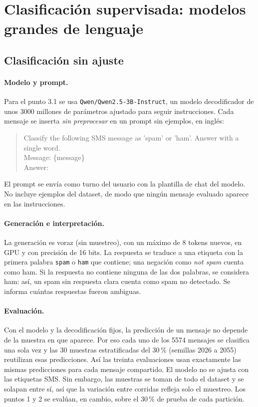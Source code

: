 \section{Clasificación supervisada: modelos grandes de lenguaje}
\label{sec:punto3}


\subsection{Clasificación sin ajuste}

\paragraph{Modelo y prompt.} Para el punto 3.1 se usa
\texttt{Qwen/Qwen2.5-3B-Instruct}, un modelo decodificador de unos 3000
millones de parámetros ajustado para seguir instrucciones. Cada mensaje se
inserta \emph{sin preprocesar} en un prompt sin ejemplos, en inglés:
\begin{quote}\small\ttfamily
Classify the following SMS message as 'spam' or 'ham'. Answer with a single
word.\\[2pt]
Message: \{message\}\\
Answer:
\end{quote}
El prompt se envía como turno del usuario con la plantilla de chat del modelo.
No incluye ejemplos del dataset, de modo que ningún mensaje evaluado aparece
en las instrucciones.

\paragraph{Generación e interpretación.} La generación es voraz (sin
muestreo), con un máximo de 8 tokens nuevos, en GPU y con precisión de 16
bits. La respuesta se traduce a una etiqueta con la primera palabra
\texttt{spam} o \texttt{ham} que contiene; una negación como \emph{not spam}
cuenta como ham. Si la respuesta no contiene ninguna de las dos palabras, se
considera ham: así, un spam sin respuesta clara cuenta como spam no detectado.
Se informa cuántas respuestas fueron ambiguas.

\paragraph{Evaluación.} Con el modelo y la decodificación fijos, la
predicción de un mensaje no depende de la muestra en que aparece. Por eso cada
uno de los 5574 mensajes se clasifica una sola vez y las 30 muestras
estratificadas del 30\,\% (semillas 2026 a 2055) reutilizan esas predicciones.
Así las treinta evaluaciones usan exactamente las mismas predicciones para
cada mensaje compartido. El modelo no se ajusta con las etiquetas SMS.
Sin embargo, las muestras se toman de todo el dataset y se
solapan entre sí, así que la variación entre corridas refleja solo el
muestreo. Los puntos 1 y 2 se evalúan, en cambio, sobre el 30\,\% de prueba
de cada partición.

